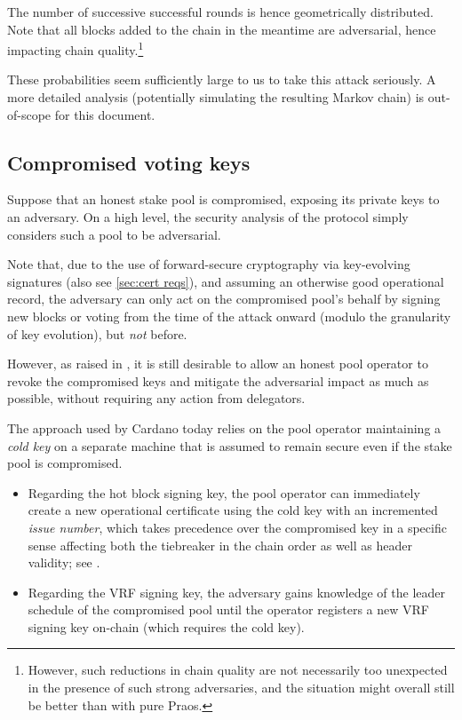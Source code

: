 \begin{enumerate}
  The number of successive successful rounds is hence geometrically distributed.
  Note that all blocks added to the chain in the meantime are adversarial, hence impacting chain quality.\footnote{However, such reductions in chain quality are not necessarily too unexpected in the presence of such strong adversaries, and the situation might overall still be better than with pure Praos.}
\end{enumerate}

These probabilities seem sufficiently large to us to take this attack seriously.
A more detailed analysis (potentially simulating the resulting Markov chain) is out-of-scope for this document.

\subsection{Compromised voting keys}

Suppose that an honest stake pool is compromised, exposing its private keys to an adversary.
On a high level, the security analysis of the protocol simply considers such a pool to be adversarial.

Note that, due to the use of forward-secure cryptography via key-evolving signatures \parencite{bellare1999forward} (also see \cref{sec:cert reqs}), and assuming an otherwise good operational record, the adversary can only act on the compromised pool's behalf by signing new blocks or voting from the time of the attack onward (modulo the granularity of key evolution), but \emph{not} before.

However, as raised in \cite[Section 2.2.4]{kant2020shelley}, it is still desirable to allow an honest pool operator to revoke the compromised keys and mitigate the adversarial impact as much as possible, without requiring any action from delegators.

The approach used by Cardano today relies on the pool operator maintaining a \emph{cold key} on a separate machine that is assumed to remain secure even if the stake pool is compromised.
\begin{itemize}
\item
  Regarding the hot block signing key, the pool operator can immediately create a new operational certificate using the cold key with an incremented \emph{issue number}, which takes precedence over the compromised key in a specific sense affecting both the tiebreaker in the chain order as well as header validity; see \cite[Section 3.3.7 and 3.3.8]{kant2020shelley}.
\item
  Regarding the VRF signing key, the adversary gains knowledge of the leader schedule of the compromised pool until the operator registers a new VRF signing key on-chain (which requires the cold key).
\end{itemize}

